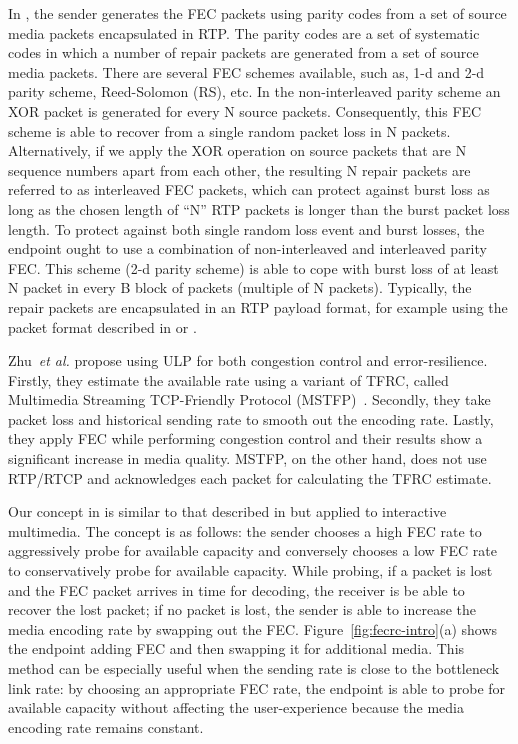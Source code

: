 In , the sender generates the FEC packets using parity codes
from a set of source media packets encapsulated in RTP. The parity codes are a
set of systematic codes in which a number of repair packets are generated from
a set of source media packets. There are several FEC schemes available, such
as, 1-d and 2-d parity scheme, Reed-Solomon (RS), etc. In the non-interleaved
parity scheme an XOR packet is generated for every  N source packets.
Consequently, this FEC scheme is able to recover from a single random packet
loss in N packets. Alternatively, if we apply the XOR operation on  source
packets that are N sequence numbers apart from each other, the resulting N
repair packets are referred to as interleaved FEC packets, which can protect
against burst loss as long as the chosen length of ``N'' RTP packets  is
longer than the burst packet loss length. To protect against both single
random loss event and burst losses, the endpoint ought to use a combination of
non-interleaved and interleaved parity FEC. This scheme (2-d parity scheme) is
able to cope with burst loss of at least N packet in every B block of packets
(multiple of N packets). Typically, the repair packets  are encapsulated in an
RTP payload format, for example using the packet format  described in
\cite{rfc5109} or \cite{draft.flex.fec}.



Zhu~\emph{et al.}\cite{Zhu:2001tu,springerlink:1022865704606} propose using
ULP for both congestion control and error-resilience.
Firstly, they estimate the available rate using a variant of TFRC,
called Multimedia Streaming TCP-Friendly Protocol (MSTFP)~\cite{871542}.
Secondly, they take packet loss and historical sending rate to smooth out the
encoding rate. Lastly, they apply FEC while performing congestion control and
their results show a significant increase in media quality. MSTFP, on the other
hand, does not use RTP/RTCP and acknowledges each packet for calculating the
TFRC estimate.

Our concept in  is similar to that described in
\cite{Zhu:2001tu} but applied to interactive multimedia. The concept is as
follows: the sender chooses a high FEC rate to aggressively probe for
available capacity and conversely chooses a low FEC rate to conservatively
probe for available capacity. While probing, if a packet is lost and the FEC
packet arrives in time for decoding, the receiver is be able to recover the
lost packet; if no packet is lost, the sender is able to increase the media
encoding rate by swapping out the FEC. Figure~\ref{fig:fecrc-intro}(a) shows
the endpoint adding FEC and then swapping it for additional media. This method
can be especially useful when the sending rate is close to the bottleneck link
rate: by choosing an appropriate FEC rate, the endpoint is able to probe for
available capacity without affecting the user-experience because the media
encoding rate remains constant.


